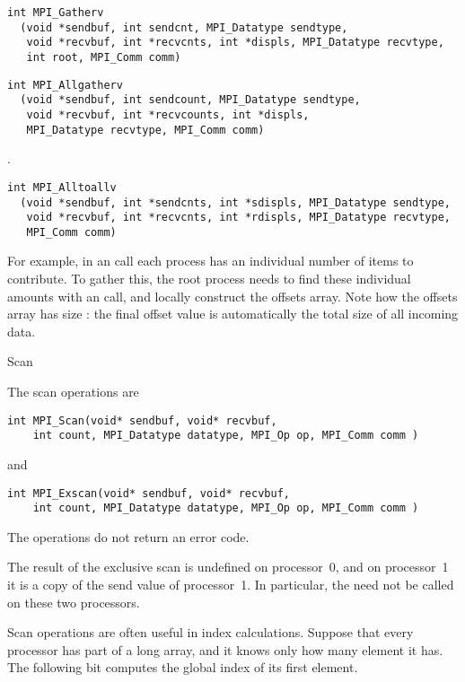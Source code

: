 \begin{verbatim}
int MPI_Gatherv
  (void *sendbuf, int sendcnt, MPI_Datatype sendtype,
   void *recvbuf, int *recvcnts, int *displs, MPI_Datatype recvtype,
   int root, MPI_Comm comm)
\end{verbatim}

\begin{verbatim}
int MPI_Allgatherv
  (void *sendbuf, int sendcount, MPI_Datatype sendtype, 
   void *recvbuf, int *recvcounts, int *displs, 
   MPI_Datatype recvtype, MPI_Comm comm)
\end{verbatim}

.
\begin{verbatim}
int MPI_Alltoallv
  (void *sendbuf, int *sendcnts, int *sdispls, MPI_Datatype sendtype, 
   void *recvbuf, int *recvcnts, int *rdispls, MPI_Datatype recvtype,
   MPI_Comm comm)
\end{verbatim}

For example, in an  call each process has an individual
number of items to contribute. To gather this, the root process needs
to find these individual amounts with an  call, and
locally construct the offsets array. Note how the offsets array has
size : the final offset value is automatically the total
size of all incoming data.  
%

 {Scan}

The scan operations are
\begin{verbatim}
int MPI_Scan(void* sendbuf, void* recvbuf, 
    int count, MPI_Datatype datatype, MPI_Op op, MPI_Comm comm ) 
\end{verbatim}
and
\begin{verbatim}
int MPI_Exscan(void* sendbuf, void* recvbuf, 
    int count, MPI_Datatype datatype, MPI_Op op, MPI_Comm comm ) 
\end{verbatim}
The  operations do not return an error code.

The result of the exclusive scan is undefined on processor~0,
and on processor~1 it is a copy of the send value of processor~1.
In particular, the  need not be called on these two 
processors.

Scan operations are often useful in index calculations. Suppose that every processor
has part of a long array, and it knows only how many element it has. The following bit
computes the global index of its first element.

